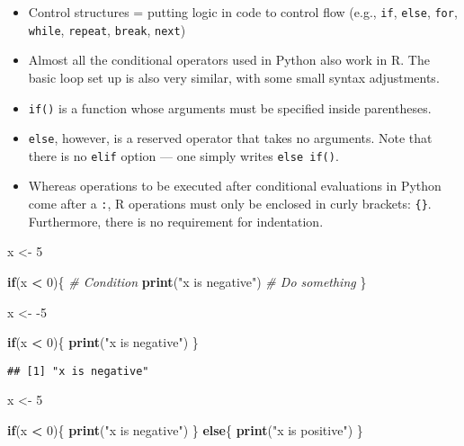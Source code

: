 \documentclass[
]{book}
\newenvironment{Shaded}{\begin{snugshade}}{\end{snugshade}}
\newcommand{\CommentTok}[1]{\textcolor[rgb]{0.56,0.35,0.01}{\textit{#1}}}
\newcommand{\ControlFlowTok}[1]{\textcolor[rgb]{0.13,0.29,0.53}{\textbf{#1}}}
\newcommand{\DecValTok}[1]{\textcolor[rgb]{0.00,0.00,0.81}{#1}}
\newcommand{\KeywordTok}[1]{\textcolor[rgb]{0.13,0.29,0.53}{\textbf{#1}}}
\newcommand{\NormalTok}[1]{#1}
\newcommand{\OperatorTok}[1]{\textcolor[rgb]{0.81,0.36,0.00}{\textbf{#1}}}
\newcommand{\StringTok}[1]{\textcolor[rgb]{0.31,0.60,0.02}{#1}}
\begin{document}
\begin{itemize}
\item
  Control structures = putting logic in code to control flow (e.g., \texttt{if}, \texttt{else}, \texttt{for}, \texttt{while}, \texttt{repeat}, \texttt{break}, \texttt{next})
\item
  Almost all the conditional operators used in Python also work in R. The basic loop set up is also very similar, with some small syntax adjustments.
\item
  \texttt{if()} is a function whose arguments must be specified inside parentheses.
\item
  \texttt{else}, however, is a reserved operator that takes no arguments. Note that there is no \texttt{elif} option --- one simply writes \texttt{else\ if()}.
\item
  Whereas operations to be executed after conditional evaluations in Python come after a \texttt{:}, R operations must only be enclosed in curly brackets: \texttt{\{\}}. Furthermore, there is no requirement for indentation.
\end{itemize}

\begin{Shaded}
\begin{Highlighting}[]
\NormalTok{x \textless{}{-}}\StringTok{ }\DecValTok{5}

\ControlFlowTok{if}\NormalTok{(x }\OperatorTok{\textless{}}\StringTok{ }\DecValTok{0}\NormalTok{)\{ }\CommentTok{\# Condition }
  \KeywordTok{print}\NormalTok{(}\StringTok{"x is negative"}\NormalTok{) }\CommentTok{\# Do something }
\NormalTok{\} }

\NormalTok{x \textless{}{-}}\StringTok{ }\DecValTok{{-}5}

\ControlFlowTok{if}\NormalTok{(x }\OperatorTok{\textless{}}\StringTok{ }\DecValTok{0}\NormalTok{)\{}
  \KeywordTok{print}\NormalTok{(}\StringTok{"x is negative"}\NormalTok{)}
\NormalTok{\}}
\end{Highlighting}
\end{Shaded}

\begin{verbatim}
## [1] "x is negative"
\end{verbatim}

\begin{Shaded}
\begin{Highlighting}[]
\NormalTok{x \textless{}{-}}\StringTok{ }\DecValTok{5}

\ControlFlowTok{if}\NormalTok{(x }\OperatorTok{\textless{}}\StringTok{ }\DecValTok{0}\NormalTok{)\{}
  \KeywordTok{print}\NormalTok{(}\StringTok{"x is negative"}\NormalTok{)}
\NormalTok{\} }\ControlFlowTok{else}\NormalTok{\{}
  \KeywordTok{print}\NormalTok{(}\StringTok{"x is positive"}\NormalTok{)}
\NormalTok{\}}
\end{Highlighting}
\end{Shaded}
\end{document}
